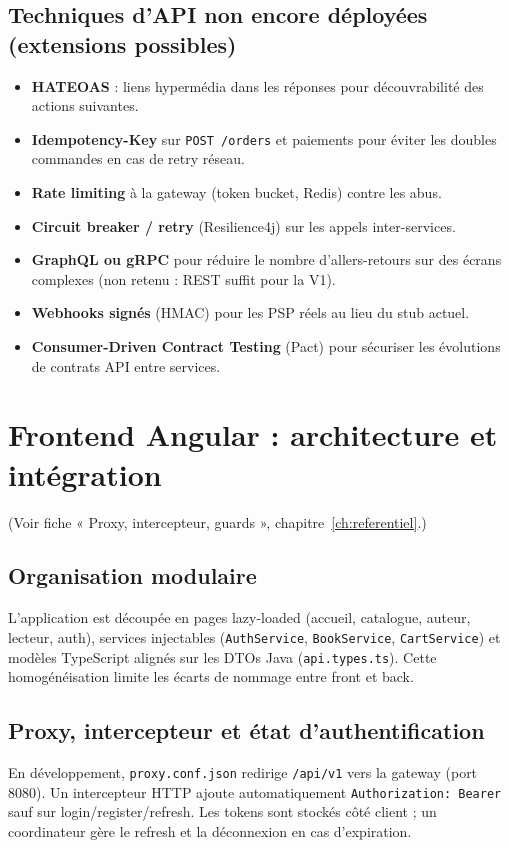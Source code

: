 \documentclass[12pt,a4paper]{report}
\begin{document}
\section{Techniques d'API non encore déployées (extensions possibles)}
\begin{itemize}
  \item \textbf{HATEOAS} : liens hypermédia dans les réponses pour découvrabilité des actions suivantes.
  \item \textbf{Idempotency-Key} sur \texttt{POST /orders} et paiements pour éviter les doubles commandes en cas de retry réseau.
  \item \textbf{Rate limiting} à la gateway (token bucket, Redis) contre les abus.
  \item \textbf{Circuit breaker / retry} (Resilience4j) sur les appels inter-services.
  \item \textbf{GraphQL ou gRPC} pour réduire le nombre d'allers-retours sur des écrans complexes (non retenu : REST suffit pour la V1).
  \item \textbf{Webhooks signés} (HMAC) pour les PSP réels au lieu du stub actuel.
  \item \textbf{Consumer-Driven Contract Testing} (Pact) pour sécuriser les évolutions de contrats API entre services.
\end{itemize}

\chapter{Frontend Angular : architecture et intégration}

(Voir fiche « Proxy, intercepteur, guards », chapitre~\ref{ch:referentiel}.)

\section{Organisation modulaire}
L'application est découpée en pages lazy-loaded (accueil, catalogue, auteur, lecteur, auth), services injectables (\texttt{AuthService}, \texttt{BookService}, \texttt{CartService}) et modèles TypeScript alignés sur les DTOs Java (\texttt{api.types.ts}). Cette homogénéisation limite les écarts de nommage entre front et back.\par

\section{Proxy, intercepteur et état d'authentification}
En développement, \texttt{proxy.conf.json} redirige \texttt{/api/v1} vers la gateway (port 8080). Un intercepteur HTTP ajoute automatiquement \texttt{Authorization: Bearer} sauf sur login/register/refresh. Les tokens sont stockés côté client ; un coordinateur gère le refresh et la déconnexion en cas d'expiration.\par
\end{document}
